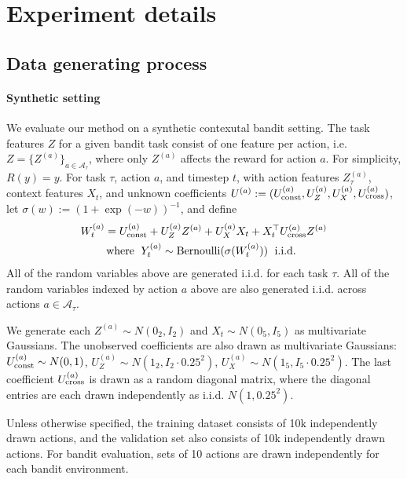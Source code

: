 \section{Experiment details}
\label{app:experiments}

\subsection{Data generating process}
\label{app:dgp}
\paragraph{Synthetic setting}
We evaluate our method on a synthetic contexutal bandit setting. The task features $Z$ for a given bandit task consist of one feature per action, i.e. $Z=\{Z^{(a)}\}_{a\in \mathcal A_{\tau}}$, where only $Z^{(a)}$ affects the reward for action $a$.
For simplicity, $R(y)=y$. 
For task $\tau$, action $a$, and timestep $t$, with action features $Z^{(a)}_{\tau}$, context features $X_t$, and unknown coefficients $U^{(a)}:=(U^{(a)}_{\rm const}, U^{(a)}_{Z}, U^{(a)}_{X}, U^{(a)}_{\rm cross})$, let $\sigma(w):=(1+\exp(-w))^{-1}$, and define
\begin{align}
\label{eq:synthetic_dgp}
&W^{(a)}_t = U^{(a)}_{\rm const} + U^{(a)}_{Z} Z^{(a)}+U^{(a)}_{X} X_t + X_t^\top U^{(a)}_{\rm cross} Z^{(a)}\nonumber\\
&\quad\quad\textrm{ where }\;Y^{(a)}_t\sim \textrm{Bernoulli}(\sigma(W^{(a)}_t)) \; \textrm{ i.i.d.}
\end{align}
All of the random variables above are generated i.i.d. for each task $\tau$. All of the random variables indexed by action $a$ above are also generated i.i.d. across actions $a\in\mathcal A_{\tau}$. 

We generate each $Z^{(a)}\sim N(0_2,I_2)$ and $X_t\sim N(0_5,I_5)$ as multivariate Gaussians. The unobserved coefficients are also drawn as multivariate Gaussians: $U_{\rm const}^{(a)}\sim N(0,1)$, $U_Z^{(a)}\sim N(1_2,I_2 \cdot 0.25^2)$,
$U_X^{(a)}\sim N(1_5,I_5 \cdot 0.25^2)$. The last coefficient
$U^{(a)}_{\rm cross}$ is drawn as a random diagonal matrix, where the diagonal entries are each drawn independently as i.i.d. $N(1,0.25^2)$. 

Unless otherwise specified, the training dataset consists of 10k independently drawn actions, and the validation set also consists of 10k independently drawn actions. For bandit evaluation, sets of 10 actions are drawn independently for each bandit environment. 



